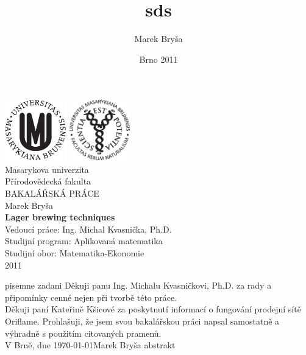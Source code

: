 \documentclass[a4wide,12pt]{report}
\title{sds}
\author{Marek Bryša}
\date{Brno 2011}
\begin{document}
\thispagestyle{empty}
\pagebreak
\mbox{}%
\vfill

\begin{center}
\includegraphics[width=0.2\textwidth]{./znak_MU_cerny.eps}\hspace{2cm}
\includegraphics[width=0.2\textwidth]{./znak_PrF_cerny.eps}\\[1cm]    

{\LARGE Masarykova univerzita}\\[0.5cm]
{\LARGE Přírodovědecká fakulta}\\[0.5cm]
{\LARGE BAKALÁŘSKÁ PRÁCE}\\[0.5cm]
{\LARGE Marek Bryša}\\[0.5cm]

{ \huge \bfseries Lager brewing techniques}\\[0.4cm]
{\large Vedoucí práce: Ing. Michal Kvasnička, Ph.D.}\\[0.5cm]
{\large Studijní program: Aplikovaná matematika}\\
{\large Studijní obor: Matematika-Ekonomie}\\[0.5cm]
{\large 2011}\\
\vspace{5cm}

\vfill
\pagebreak

\end{center}

\newpage
\thispagestyle{empty}
pisemne zadani
\newpage
\thispagestyle{empty}
\vspace{2cm}
\noindent
Děkuji panu Ing. Michalu Kvasničkovi, Ph.D. za rady a připomínky cenné nejen při tvorbě této práce.\\
Děkuji paní Kateřině Kšicové za poskytnutí informací o fungování prodejní sítě Oriflame.
\vfill
\noindent
Prohlašuji, že jsem svou bakalářskou práci napsal samostatně a výhradně s použitím citovaných pramenů.\\[3cm]
V Brně, dne \today \hfill Marek Bryša\hspace{3cm}
\vspace{1.5cm}
\newpage
\newpage
\thispagestyle{empty}
abstrakt
\newpage
\tableofcontents
\end{document}
